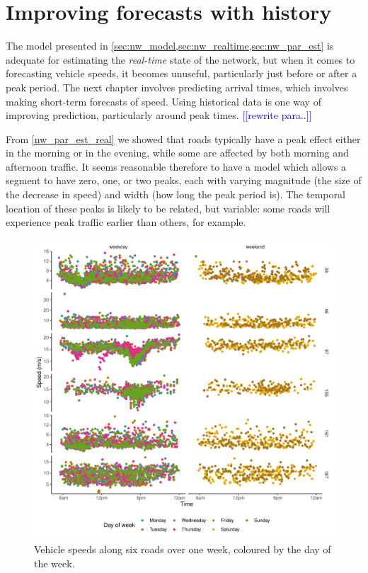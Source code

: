 \section{Improving forecasts with history}
\label{sec:nw_hist_model}

The model presented in \cref{sec:nw_model,sec:nw_realtime,sec:nw_par_est} is adequate for estimating the \emph{real-time} state of the network, but when it comes to forecasting vehicle speeds, it becomes unuseful, particularly just before or after a peak period. The next chapter involves predicting arrival times, which involves making short-term forecasts of speed. Using historical data is one way of improving prediction, particularly around peak times. \textcolor{blue}{[[rewrite para..]]}

From \cref{nw_par_est_real} we showed that roads typically have a peak effect either in the morning or in the evening, while some are affected by both morning and afternoon traffic. It seems reasonable therefore to have a model which allows a segment to have zero, one, or two peaks, each with varying magnitude (the size of the decrease in speed) and width (how long the peak period is). The temporal location of these peaks is likely to be related, but variable: some roads will experience peak traffic earlier than others, for example.

\begin{knitrout}\small
{}\color{fgcolor}\begin{figure}

{\centering \includegraphics[width=\textwidth]{figure/tt_week0_load-1} 

}

\caption[Vehicle speeds along six roads over one week, coloured by the day of the week]{Vehicle speeds along six roads over one week, coloured by the day of the week.}\label{fig:tt_week0_load}
\end{figure}


\end{knitrout}

